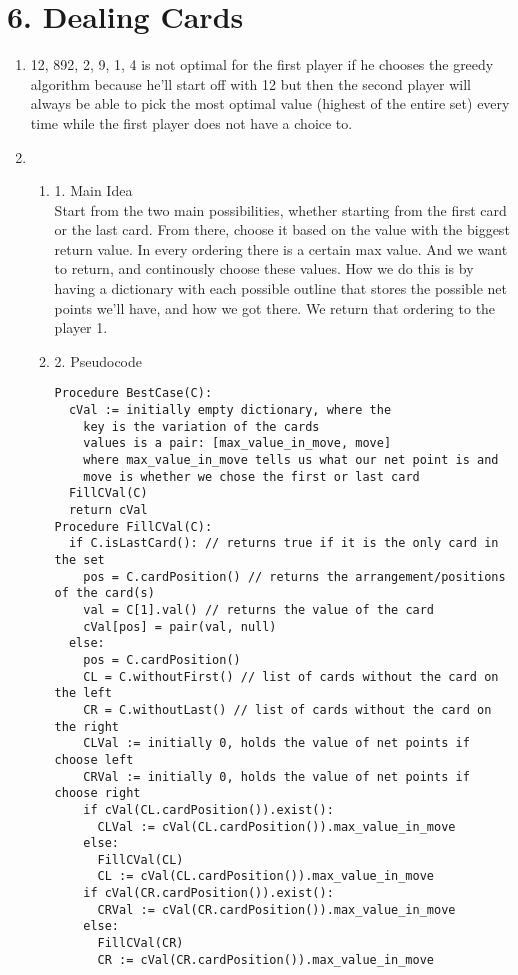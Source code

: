 \documentclass[11pt]{article}
\newenvironment{qparts}{\begin{enumerate}[{(}a{)}]}{\end{enumerate}}
\begin{document}
\section*{6. Dealing Cards}
\begin{qparts}
	\item 12, 892, 2, 9, 1, 4 is not optimal for the first player if he chooses the greedy algorithm because he'll start off with 12 but then the second player will always be able to pick the most optimal value (highest of the entire set) every time while the first player does not have a choice to. 
	\item 
	\begin{qparts}
\item[1.] Main Idea \\
Start from the two main possibilities, whether starting from the first card or the last card. From there, choose it based on the value with the biggest return value. In every ordering there is a certain max value. And we want to return, and continously choose these values. How we do this is by having a dictionary with each possible outline that stores the possible net points we'll have, and how we got there. We return that ordering to the player 1.
\item[2.] Pseudocode 
\begin{verbatim}
Procedure BestCase(C):
  cVal := initially empty dictionary, where the
    key is the variation of the cards
    values is a pair: [max_value_in_move, move]
    where max_value_in_move tells us what our net point is and
    move is whether we chose the first or last card
  FillCVal(C)
  return cVal
Procedure FillCVal(C):
  if C.isLastCard(): // returns true if it is the only card in the set
    pos = C.cardPosition() // returns the arrangement/positions of the card(s)
    val = C[1].val() // returns the value of the card
    cVal[pos] = pair(val, null)
  else:
    pos = C.cardPosition()
    CL = C.withoutFirst() // list of cards without the card on the left
    CR = C.withoutLast() // list of cards without the card on the right
    CLVal := initially 0, holds the value of net points if choose left
    CRVal := initially 0, holds the value of net points if choose right
    if cVal(CL.cardPosition()).exist():
      CLVal := cVal(CL.cardPosition()).max_value_in_move
    else: 
      FillCVal(CL)
      CL := cVal(CL.cardPosition()).max_value_in_move
    if cVal(CR.cardPosition()).exist():
      CRVal := cVal(CR.cardPosition()).max_value_in_move
    else:
      FillCVal(CR)
      CR := cVal(CR.cardPosition()).max_value_in_move

\end{verbatim}
\end{qparts}
\end{qparts}
\end{document}
